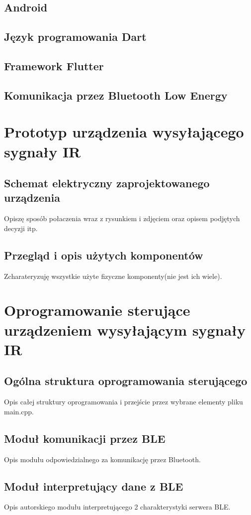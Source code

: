 \documentclass[12pt,twoside]{article}
\begin{document}
\subsection{Android}
\subsection{Język programowania Dart}
\subsection{Framework Flutter}
\subsection{Komunikacja przez Bluetooth Low Energy}

\clearpage	

\section{Prototyp urządzenia wysyłającego sygnały IR}
\subsection{Schemat elektryczny zaprojektowanego urządzenia}
Opiszę sposób połaczenia wraz z rysunkiem i zdjęciem oraz opisem podjętych decyzji itp.
\subsection{Przegląd i opis użytych komponentów}
Zcharateryzuję wszystkie użyte fizyczne komponenty(nie jest ich wiele).
\clearpage

\section{Oprogramowanie sterujące urządzeniem wysyłającym sygnały IR}
\subsection{Ogólna struktura oprogramowania sterującego}
Opis całej struktury oprogramowania i przejście przez wybrane elementy pliku main.cpp.
\subsection{Moduł komunikacji przez BLE}
Opis modułu odpowiedzialnego za komunikację przez Bluetooth.
\subsection{Moduł interpretujący dane z BLE}
Opis autorskiego modułu interpretującego 2 charakterystyki serwera BLE.
\end{document}
